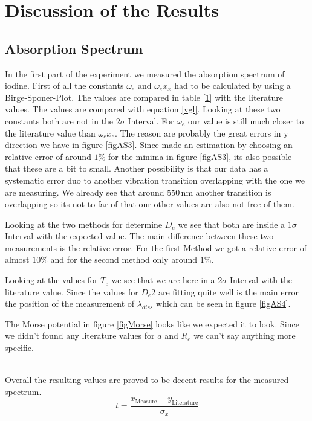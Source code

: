 \section{Discussion of the Results}
\subsection{Absorption Spectrum}
In the first part of the experiment we measured the absorption spectrum of iodine. First of all the constants $\omega_e$ and $\omega_ex_x$ had to be calculated by using a Birge-Sponer-Plot. The values are compared in table \ref{1} with the literature values. The values are compared with equation \ref{vgl}. Looking at these two constants both are not in the $2\sigma$ Interval. For $\omega_e$ our value is still much closer to the literature value than  $\omega_ex_e$. The reason are probably the great errors in y direction we have in figure \ref{figAS3}. Since made an estimation by choosing an relative error of around $1\%$ for the minima in figure \ref{figAS3}, its also possible that these are a bit to small. Another possibility is that our data has a systematic error duo to another vibration transition overlapping with the one we are measuring. We already see that around $550\,$nm another transition is overlapping so its not to far of that our other values are also not free of them.\par
Looking at the two methods for determine $D_e$ we see that both are inside a $1\sigma$ Interval with the expected value. The main difference between these two measurements is the relative error. For the first Method we got a relative error of almost $10\%$ and for the second method only around $1\%$.\par
Looking at the values for $T_e$ we see that we are here in a $2\sigma$ Interval with the literature value. Since the values for $D_e2$ are fitting quite well is the main error the position of the measurement of $\lambda_{diss}$ which can be seen in figure \ref{figAS4}.\par
The Morse potential in figure \ref{figMorse} looks like we expected it to look. Since we didn't found any literature values for $a$ and $R_e$ we can't say anything more specific.\par
\ \\
Overall the resulting values are proved to be decent results for the measured spectrum.
\begin{equation}
	t=\frac{x_{\text{Measure}}-y_\text{Literature}}{\sigma_x}
	\label{vgl}
\end{equation} 

